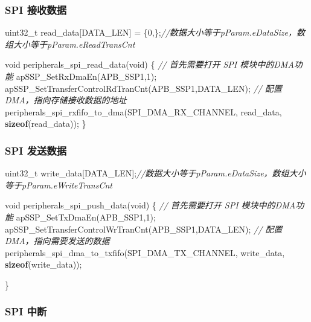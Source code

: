 \documentclass[
  12pt,
]{book}
\newenvironment{Shaded}{\begin{snugshade}}{\end{snugshade}}
\newcommand{\CommentTok}[1]{\textcolor[rgb]{0.56,0.35,0.01}{\textit{#1}}}
\newcommand{\DataTypeTok}[1]{\textcolor[rgb]{0.13,0.29,0.53}{#1}}
\newcommand{\DecValTok}[1]{\textcolor[rgb]{0.00,0.00,0.81}{#1}}
\newcommand{\KeywordTok}[1]{\textcolor[rgb]{0.13,0.29,0.53}{\textbf{#1}}}
\newcommand{\NormalTok}[1]{#1}
\begin{document}
\hypertarget{spi-ux63a5ux6536ux6570ux636e-4}{%
\subsubsection{SPI 接收数据}\label{spi-ux63a5ux6536ux6570ux636e-4}}

\begin{Shaded}
\begin{Highlighting}[]
\DataTypeTok{uint32_t}\NormalTok{ read_data[DATA_LEN] = \{}\DecValTok{0}\NormalTok{,\};}\CommentTok{//数据大小等于pParam.eDataSize，数组大小等于pParam.eReadTransCnt}

\DataTypeTok{void}\NormalTok{ peripherals_spi_read_data(}\DataTypeTok{void}\NormalTok{)}
\NormalTok{\{}
  \CommentTok{// 首先需要打开 SPI 模块中的DMA功能}
\NormalTok{  apSSP_SetRxDmaEn(APB_SSP1,}\DecValTok{1}\NormalTok{);}
\NormalTok{  apSSP_SetTransferControlRdTranCnt(APB_SSP1,DATA_LEN);}
  \CommentTok{// 配置DMA，指向存储接收数据的地址}
\NormalTok{  peripherals_spi_rxfifo_to_dma(SPI_DMA_RX_CHANNEL, read_data, }\KeywordTok{sizeof}\NormalTok{(read_data));}
\NormalTok{\}}
\end{Highlighting}
\end{Shaded}

\hypertarget{spi-ux53d1ux9001ux6570ux636e-4}{%
\subsubsection{SPI 发送数据}\label{spi-ux53d1ux9001ux6570ux636e-4}}

\begin{Shaded}
\begin{Highlighting}[]
\DataTypeTok{uint32_t}\NormalTok{ write_data[DATA_LEN];}\CommentTok{//数据大小等于pParam.eDataSize，数组大小等于pParam.eWriteTransCnt}

\DataTypeTok{void}\NormalTok{ peripherals_spi_push_data(}\DataTypeTok{void}\NormalTok{)}
\NormalTok{\{}
  \CommentTok{// 首先需要打开 SPI 模块中的DMA功能}
\NormalTok{  apSSP_SetTxDmaEn(APB_SSP1,}\DecValTok{1}\NormalTok{);}
\NormalTok{  apSSP_SetTransferControlWrTranCnt(APB_SSP1,DATA_LEN);}
  \CommentTok{// 配置DMA，指向需要发送的数据}
\NormalTok{  peripherals_spi_dma_to_txfifo(SPI_DMA_TX_CHANNEL, write_data, }\KeywordTok{sizeof}\NormalTok{(write_data));}

\NormalTok{\}}
\end{Highlighting}
\end{Shaded}

\hypertarget{spi-ux4e2dux65ad-5}{%
\subsubsection{SPI 中断}\label{spi-ux4e2dux65ad-5}}
\end{document}
